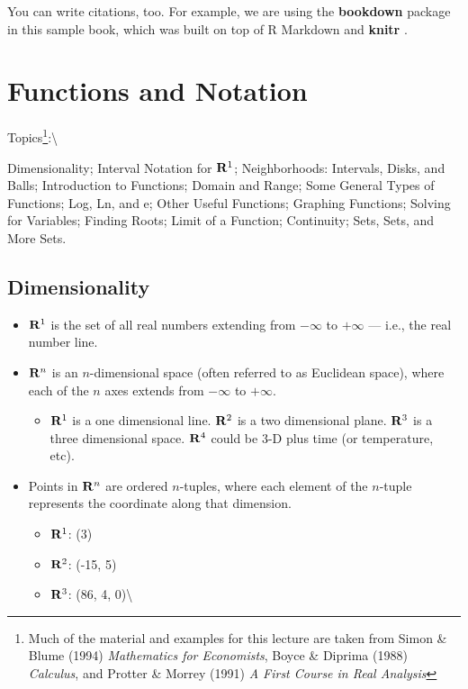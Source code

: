 \documentclass[]{book}
\providecommand{\tightlist}{%
  \setlength{\itemsep}{0pt}\setlength{\parskip}{0pt}}
\let\rmarkdownfootnote\footnote%
\def\footnote{\protect\rmarkdownfootnote}
\theoremstyle{definition}
\theoremstyle{definition}
\theoremstyle{definition}
\theoremstyle{remark}
\begin{document}
You can write citations, too. For example, we are using the
\textbf{bookdown} package \citep{R-bookdown} in this sample book, which
was built on top of R Markdown and \textbf{knitr} \citep{xie2015}.

\chapter{Functions and Notation}\label{functions-and-notation}

Topics\footnote{Much of the material and examples for this lecture are taken from Simon \& Blume (1994) \emph{Mathematics for Economists}, Boyce \& Diprima (1988) \emph{Calculus}, and Protter \& Morrey (1991) \emph{A First Course in Real Analysis}}:\textbackslash{}

Dimensionality; Interval Notation for \({\bf R}^1\); Neighborhoods:
Intervals, Disks, and Balls; Introduction to Functions; Domain and
Range; Some General Types of Functions; Log, Ln, and e; Other Useful
Functions; Graphing Functions; Solving for Variables; Finding Roots;
Limit of a Function; Continuity; Sets, Sets, and More Sets.

\section{Dimensionality}\label{dimensionality}

\begin{itemize}
\tightlist
\item
  \({\bf R}^1\) is the set of all real numbers extending from
  \(-\infty\) to \(+\infty\) --- i.e., the real number line.
\item
  \({\bf R}^n\) is an \(n\)-dimensional space (often referred to as
  Euclidean space), where each of the \(n\) axes extends from
  \(-\infty\) to \(+\infty\).

  \begin{itemize}
  \tightlist
  \item
    \({\bf R}^1\) is a one dimensional line. \({\bf R}^2\) is a two
    dimensional plane. \({\bf R}^3\) is a three dimensional space.
    \({\bf R}^4\) could be 3-D plus time (or temperature, etc).
  \end{itemize}
\item
  Points in \({\bf R}^n\) are ordered \(n\)-tuples, where each element
  of the \(n\)-tuple represents the coordinate along that dimension.

  \begin{itemize}
  \tightlist
  \item
    \({\bf R}^1\): (3)
  \item
    \({\bf R}^2\): (-15, 5)
  \item
    \({\bf R}^3\): (86, 4, 0)\textbackslash{}
  \end{itemize}
\end{itemize}
\end{document}
